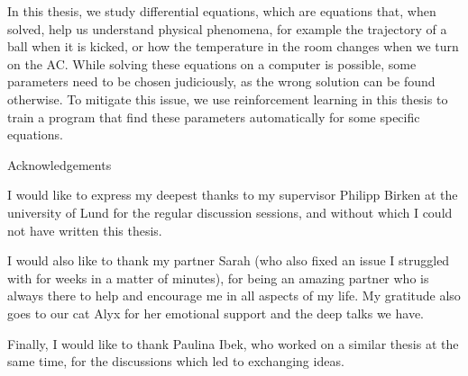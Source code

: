 In this thesis, we study differential equations, which are equations that, when solved, help us understand physical phenomena, for example the trajectory of a ball when it is kicked, or how the temperature in the room changes when we turn on the AC. While solving these equations on a computer is possible, some parameters need to be chosen judiciously, as the wrong solution can be found otherwise. To mitigate this issue, we use reinforcement learning in this thesis to train a program that find these parameters automatically for some specific equations.


\newpage



\begin{center}
\huge{Acknowledgements}
\end{center}

\vspace*{\baselineskip}

I would like to express my deepest thanks to my supervisor Philipp Birken at the university of Lund for the regular discussion sessions, and without which I could not have written this thesis.

I would also like to thank my partner Sarah (who also fixed an issue I struggled with for weeks in a matter of minutes), for being an amazing partner who is always there to help and encourage me in all aspects of my life. My gratitude also goes to our cat Alyx for her emotional support and the deep talks we have. 

Finally, I would like to thank Paulina Ibek, who worked on a similar thesis at the same time, for the discussions which led to exchanging ideas.

\newpage

